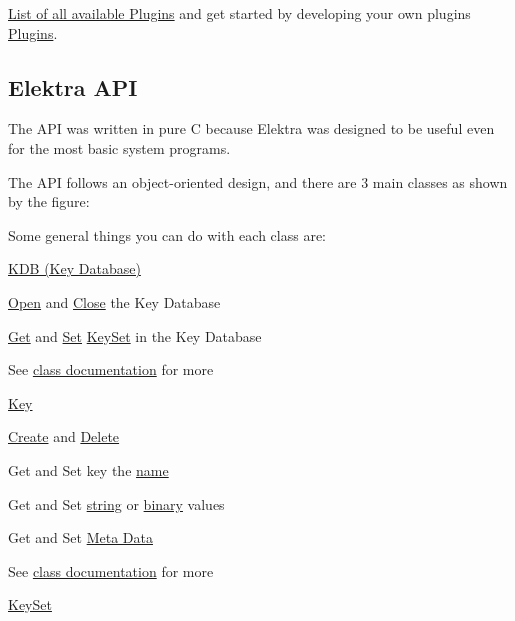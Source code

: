 \hyperlink{src_plugins_README_md}{List of all available Plugins} and get started by developing your own plugins \hyperlink{group__plugin}{Plugins}.

\subsection*{Elektra A\+PI}

The A\+PI was written in pure C because Elektra was designed to be useful even for the most basic system programs.

The A\+PI follows an object-\/oriented design, and there are 3 main classes as shown by the figure\+:

 Some general things you can do with each class are\+:

\hyperlink{group__kdb}{K\+DB (Key Database)}


\begin{DoxyItemize}
\item \hyperlink{group__kdb_ga6808defe5870f328dd17910aacbdc6ca}{Open} and \hyperlink{group__kdb_gadb54dc9fda17ee07deb9444df745c96f}{Close} the Key Database
\item \hyperlink{group__kdb_ga28e385fd9cb7ccfe0b2f1ed2f62453a1}{Get} and \hyperlink{group__kdb_ga11436b058408f83d303ca5e996832bcf}{Set} \hyperlink{group__keyset}{Key\+Set} in the Key Database
\item See \hyperlink{group__kdb}{class documentation} for more
\end{DoxyItemize}

\hyperlink{group__key}{Key}


\begin{DoxyItemize}
\item \hyperlink{group__key_gad23c65b44bf48d773759e1f9a4d43b89}{Create} and \hyperlink{group__key_ga3df95bbc2494e3e6703ece5639be5bb1}{Delete}
\item Get and Set key the \hyperlink{group__keyname_ga7699091610e7f3f43d2949514a4b35d9}{name}
\item Get and Set \hyperlink{group__keyvalue_ga622bde1eb0e0c4994728331326340ef2}{string} or \hyperlink{group__keyvalue_gaa50a5358fd328d373a45f395fa1b99e7}{binary} values
\item Get and Set \hyperlink{group__keymeta}{Meta Data}
\item See \hyperlink{group__key}{class documentation} for more
\end{DoxyItemize}

\hyperlink{group__keyset}{Key\+Set}


